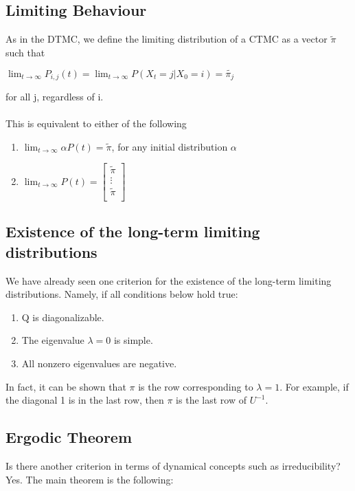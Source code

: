 \documentclass[12pt]{article}
\begin{document}
\subsection{Limiting Behaviour}

As in the DTMC, we define the limiting distribution of a CTMC as a vector $\tilde{\pi}$ such that
\begin{center}
    $\lim_{t \to \infty} P_{i,j}(t) = \lim_{t \to \infty} P(X_t =j|X_0=i)=\tilde{\pi_j} $
\end{center}
for all j, regardless of i.
\\
\\This is equivalent to either of the following
\begin{enumerate}
    \item $\lim_{t \to \infty} \alpha P(t) = \tilde{\pi}$, for any initial distribution $\alpha$
    \item $\lim_{t \to \infty} P(t) = \begin{bmatrix}
 \tilde{\pi} \\
\vdots \\
\tilde{\pi} \\
\end{bmatrix}$
\end{enumerate}

\subsection{Existence of the long-term limiting distributions}

We have already seen one criterion for the existence of the long-term limiting distributions. Namely, if all conditions below hold true:
\begin{enumerate}
    \item Q is diagonalizable.
    \item The eigenvalue $\lambda = 0$ is simple.
    \item All nonzero eigenvalues are negative.
\end{enumerate}

\noindent In fact, it can be shown that $\pi$ is the row corresponding to $\lambda = 1$. For example, if the diagonal 1 is in the last row, then $\pi$ is the last row of $U^{-1}$.

\subsection{Ergodic Theorem}

Is there another criterion in terms of dynamical concepts such as irreducibility? Yes. The main theorem is the following:
\end{document}
